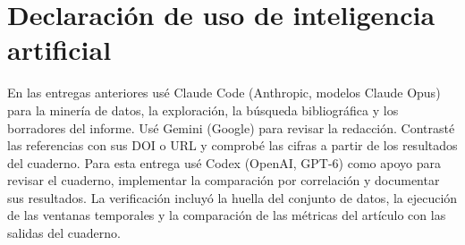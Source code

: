 \section*{Declaración de uso de inteligencia artificial}
{\footnotesize En las entregas anteriores usé Claude Code (Anthropic, modelos Claude Opus) para la minería de datos, la exploración, la búsqueda bibliográfica y los borradores del informe. Usé Gemini (Google) para revisar la redacción. Contrasté las referencias con sus DOI o URL y comprobé las cifras a partir de los resultados del cuaderno. Para esta entrega usé Codex (OpenAI, GPT-6) como apoyo para revisar el cuaderno, implementar la comparación por correlación y documentar sus resultados. La verificación incluyó la huella del conjunto de datos, la ejecución de las ventanas temporales y la comparación de las métricas del artículo con las salidas del cuaderno.}

